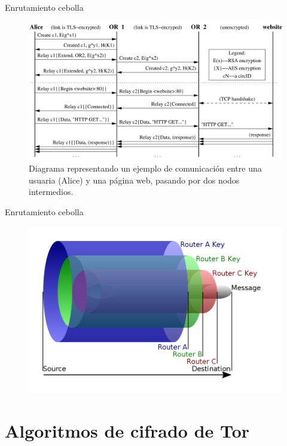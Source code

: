 \documentclass[spanish]{beamer}
\begin{document}
\begin{frame}{Enrutamiento cebolla}

\begin{figure}[h]
  \includegraphics[width=\textwidth]{OR5.png}
  \caption{Diagrama representando un ejemplo de comunicación entre una usuaria (Alice) y una página web, pasando por dos nodos intermedios.}
  \label{fig:or5}
\end{figure}

\end{frame}

\begin{frame}{Enrutamiento cebolla}

\begin{figure}[h]
  \includegraphics[width=\textwidth]{OR4.png}
  \label{fig:or4}
\end{figure}

\end{frame}

\section{Algoritmos de cifrado de Tor}
\end{document}
